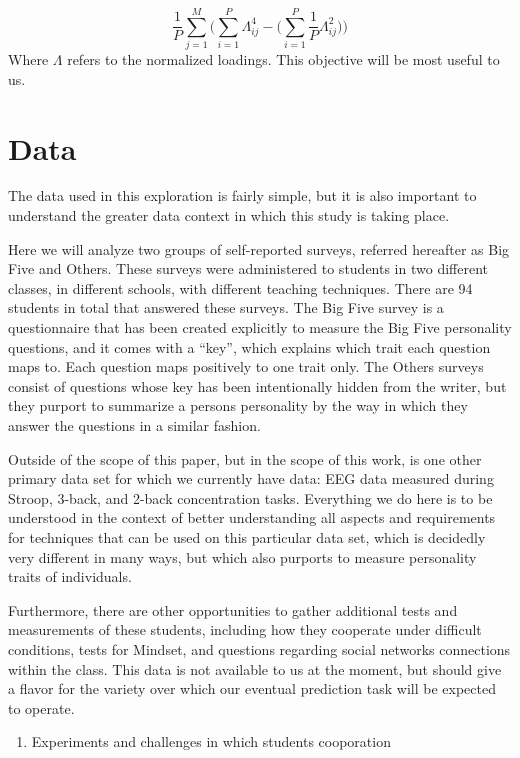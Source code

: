 \documentclass[a4paper,12pt]{article}
\begin{document}
\begin{equation}
\frac{1}{P} \sum_{j=1}^M \bigg( \sum_{i=1}^P\Lambda_{ij}^4 - \bigg( \sum_{i=1}^P\frac{1}{P}\Lambda_{ij}^2\bigg)\bigg)
\end{equation}
%
Where $\Lambda$ refers to the normalized loadings. This objective will be most useful to us.

\section{Data}

The data used in this exploration is fairly simple, but it is also important to understand the greater data context in which this study is taking place.

Here we will analyze two groups of self-reported surveys, referred hereafter as Big Five and Others. These surveys were administered to students in two different classes, in different schools, with different teaching techniques. There are 94 students in total that answered these surveys. The Big Five survey is a questionnaire that has been created explicitly to measure the Big Five personality questions, and it comes with a ``key'', which explains which trait each question maps to. Each question maps positively to one trait only. The Others surveys consist of questions whose key has been intentionally hidden from the writer, but they purport to summarize a persons personality by the way in which they answer the questions in a similar fashion.

Outside of the scope of this paper, but in the scope of this work, is one other primary data set for which we currently have data: EEG data measured during Stroop, 3-back, and 2-back concentration tasks. Everything we do here is to be understood in the context of better understanding all aspects and requirements for techniques that can be used on this particular data set, which is decidedly very different in many ways, but which also purports to measure personality traits of individuals.

Furthermore, there are other opportunities to gather additional tests and measurements of these students, including how they cooperate under difficult conditions, tests for Mindset, and questions regarding social networks connections within the class. This data is not available to us at the moment, but should give a flavor for the variety over which our eventual prediction task will be expected to operate.

\begin{enumerate}
\item Experiments and challenges in which students cooporation
\end{enumerate}
\end{document}
